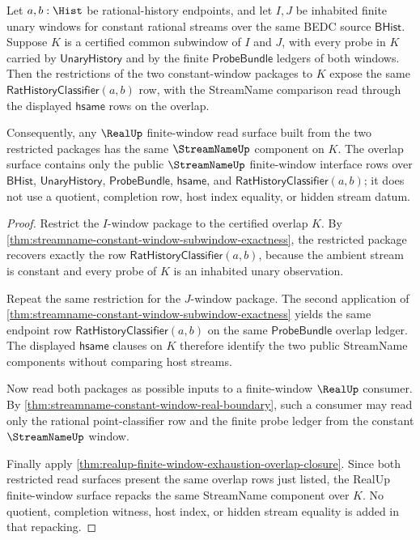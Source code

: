 \begin{theorem}
\label{thm:streamname-constant-window-overlap-exactness}
Let $a,b:\Hist$ be rational-history endpoints, and let $I,J$ be inhabited
finite unary windows for constant rational streams over the same BEDC source
$\mathsf{BHist}$. Suppose $K$ is a certified common subwindow of $I$ and $J$,
with every probe in $K$ carried by $\mathsf{UnaryHistory}$ and by the finite
$\mathsf{ProbeBundle}$ ledgers of both windows. Then the restrictions of the two
constant-window packages to $K$ expose the same
$\mathsf{RatHistoryClassifier}(a,b)$ row, with the StreamName comparison read
through the displayed $\mathsf{hsame}$ rows on the overlap.

Consequently, any $\RealUp$ finite-window read surface built from the two
restricted packages has the same $\StreamNameUp$ component on $K$. The overlap
surface contains only the public $\StreamNameUp$ finite-window interface rows
over $\mathsf{BHist}$, $\mathsf{UnaryHistory}$, $\mathsf{ProbeBundle}$,
$\mathsf{hsame}$, and $\mathsf{RatHistoryClassifier}(a,b)$; it does not use a
quotient, completion row, host index equality, or hidden stream datum.
\end{theorem}
\begin{proof}
Restrict the $I$-window package to the certified overlap $K$. By
\autoref{thm:streamname-constant-window-subwindow-exactness}, the restricted
package recovers exactly the row $\mathsf{RatHistoryClassifier}(a,b)$, because
the ambient stream is constant and every probe of $K$ is an inhabited unary
observation.

Repeat the same restriction for the $J$-window package. The second application
of \autoref{thm:streamname-constant-window-subwindow-exactness} yields the same
endpoint row $\mathsf{RatHistoryClassifier}(a,b)$ on the same
$\mathsf{ProbeBundle}$ overlap ledger. The displayed $\mathsf{hsame}$ clauses on
$K$ therefore identify the two public StreamName components without comparing
host streams.

Now read both packages as possible inputs to a finite-window $\RealUp$ consumer.
By \autoref{thm:streamname-constant-window-real-boundary}, such a consumer may
read only the rational point-classifier row and the finite probe ledger from the
constant $\StreamNameUp$ window.

Finally apply
\autoref{thm:realup-finite-window-exhaustion-overlap-closure}. Since both
restricted read surfaces present the same overlap rows just listed, the RealUp
finite-window surface repacks the same StreamName component over $K$. No
quotient, completion witness, host index, or hidden stream equality is added in
that repacking.
\end{proof}

